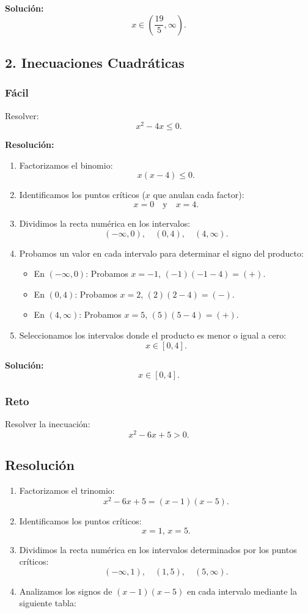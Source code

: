 \documentclass[a4,11pt]{aleph-notas}
\begin{document}
\textbf{Solución:}
$$
x \in \left(\frac{19}{5}, \infty\right).
$$

\subsection*{2. Inecuaciones Cuadráticas}

\subsubsection*{Fácil}
Resolver:
$$
x^2 - 4x \leq 0.
$$

\textbf{Resolución:}
\begin{enumerate}
    \item Factorizamos el binomio:
    $$
    x(x - 4) \leq 0.
    $$
    \item Identificamos los puntos críticos (\(x\) que anulan cada factor):
    $$
    x = 0 \quad \text{y} \quad x = 4.
    $$
    \item Dividimos la recta numérica en los intervalos:
    $$
    (-\infty, 0), \quad (0, 4), \quad (4, \infty).
    $$
    \item Probamos un valor en cada intervalo para determinar el signo del producto:
    \begin{itemize}
        \item En \( (-\infty, 0) \): Probamos \(x = -1\), \( (-1)(-1 - 4) = (+)\).
        \item En \( (0, 4) \): Probamos \(x = 2\), \( (2)(2 - 4) = (-)\).
        \item En \( (4, \infty) \): Probamos \(x = 5\), \( (5)(5 - 4) = (+)\).
    \end{itemize}
    \item Seleccionamos los intervalos donde el producto es menor o igual a cero:
    $$
    x \in [0, 4].
    $$
\end{enumerate}

\textbf{Solución:}
$$
x \in [0, 4].
$$

\subsubsection*{Reto}
Resolver la inecuación:
$$
x^2 - 6x + 5 > 0.
$$

\subsection*{Resolución}
\begin{enumerate}
    \item Factorizamos el trinomio:
    $$
    x^2 - 6x + 5 = (x - 1)(x - 5).
    $$
    \item Identificamos los puntos críticos:
    $$
    x = 1, \, x = 5.
    $$
    \item Dividimos la recta numérica en los intervalos determinados por los puntos críticos:
    $$
    (-\infty, 1), \quad (1, 5), \quad (5, \infty).
    $$
    \item Analizamos los signos de \( (x - 1)(x - 5) \) en cada intervalo mediante la siguiente tabla:
\end{enumerate}
\end{document}
